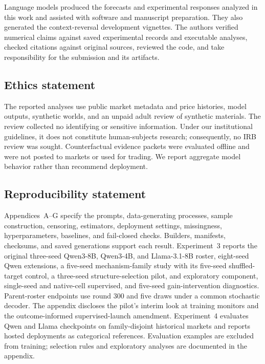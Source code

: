 \documentclass{article}
\begin{document}
Language models produced the forecasts and experimental responses analyzed in this
work and assisted with software and manuscript preparation. They also generated
the context-reversal development vignettes. The authors verified
numerical claims against saved experimental records and executable analyses, checked
citations against original sources, reviewed the code, and take responsibility for
the submission and its artifacts.

\subsection*{Ethics statement}

The reported analyses use public market metadata and price histories, model
outputs, synthetic worlds, and an unpaid adult review of synthetic materials. The
review collected no identifying or sensitive information. Under our institutional
guidelines, it does not constitute human-subjects research; consequently, no IRB
review was sought. Counterfactual evidence packets were evaluated offline and were
not posted to markets or used for trading. We report aggregate model behavior
rather than recommend deployment.

\subsection*{Reproducibility statement}
Appendices~A--G specify the prompts, data-generating processes, sample construction,
censoring, estimators, deployment settings, missingness, hyperparameters, baselines,
and fail-closed checks. Builders, manifests, checksums, and saved generations support
each result. Experiment~3 reports the original three-seed Qwen3-8B, Qwen3-4B,
and Llama-3.1-8B roster, eight-seed Qwen extensions, a five-seed mechanism-family
study with its five-seed shuffled-target control, a three-seed structure-selection pilot, and exploratory component,
single-seed and native-cell supervised, and five-seed gain-intervention diagnostics. Parent-roster endpoints use
round 300 and five draws under a common stochastic decoder. The appendix
discloses the pilot's interim look at training monitors and the outcome-informed
supervised-launch amendment.
Experiment~4 evaluates Qwen and Llama checkpoints on family-disjoint historical
markets and reports hosted deployments as categorical references. Evaluation
examples are excluded from training; selection rules and exploratory analyses
are documented in the appendix.
\end{document}

